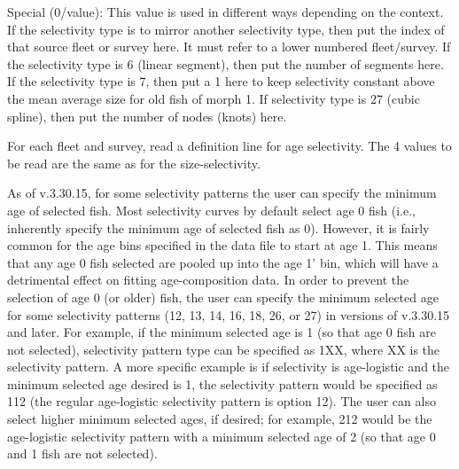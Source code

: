 Special (0/value): This value is used in different ways depending on the context. If the selectivity type is to mirror another selectivity type, then put the index of that source fleet or survey here. It must refer to a lower numbered fleet/survey. If the selectivity type is 6 (linear segment), then put the number of segments here. If the selectivity type is 7, then put a 1 here to keep selectivity constant above the mean average size for old fish of morph 1. If selectivity type is 27 (cubic spline), then put the number of nodes (knots) here.

For each fleet and survey, read a definition line for age selectivity. The 4 values to be read are the same as for the size-selectivity. 

As of v.3.30.15, for some selectivity patterns the user can specify the minimum age of selected fish. Most selectivity curves by default select age 0 fish (i.e., inherently specify the minimum age of selected fish as 0). However, it is fairly common for the age bins specified in the data file to start at age 1. This means that any age 0 fish selected are pooled up into the age 1' bin, which will have a detrimental effect on fitting age-composition data. In order to prevent the selection of age 0 (or older) fish, the user can specify the minimum selected age for some selectivity patterns (12, 13, 14, 16, 18, 26, or 27) in versions of v.3.30.15 and later. For example, if the minimum selected age is 1 (so that age 0 fish are not selected), selectivity pattern type can be specified as 1XX, where XX is the selectivity pattern. A more specific example is if selectivity is age-logistic and the minimum selected age desired is 1, the selectivity pattern would be specified as 112 (the regular age-logistic selectivity pattern is option 12). The user can also select higher minimum selected ages, if desired; for example, 212 would be the age-logistic selectivity pattern with a minimum selected age of 2 (so that age 0 and 1 fish are not selected).

